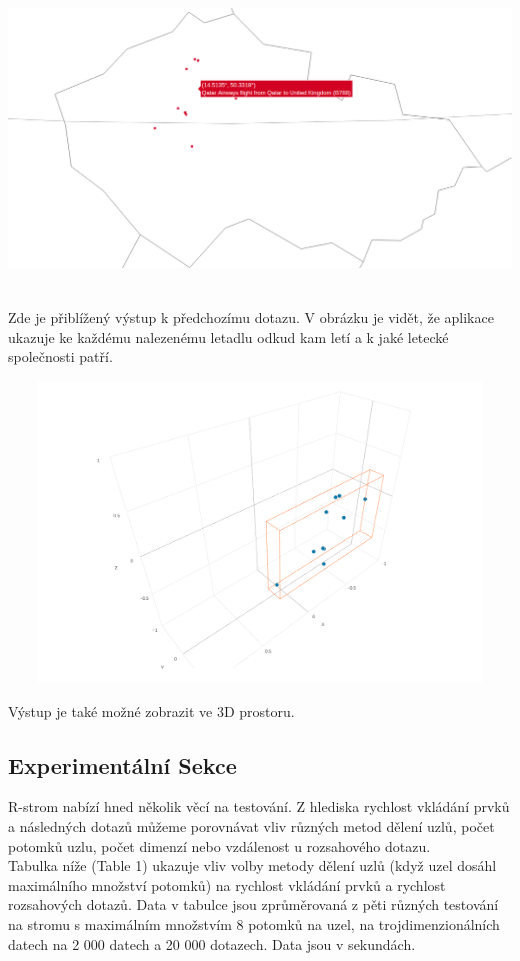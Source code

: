 \documentclass[12pt,a4paper]{article}
\begin{document}
\begin{center}
\includegraphics[width=15cm, height=8cm]{output2}
\end{center}
Zde je přiblížený výstup k předchozímu dotazu. V obrázku je vidět, že aplikace ukazuje ke každému nalezenému letadlu odkud kam letí a k jaké letecké společnosti patří.

\begin{center}
\includegraphics[width=15cm, height=8cm]{output3}
\end{center}
Výstup je také možné zobrazit ve 3D prostoru.


\subsection*{Experimentální Sekce}
R-strom nabízí hned několik věcí na testování. Z hlediska rychlost vkládání prvků a následných dotazů můžeme porovnávat vliv různých metod dělení uzlů, počet potomků uzlu, počet dimenzí nebo vzdálenost u rozsahového dotazu.\\[0.5cm]
Tabulka níže (Table 1) ukazuje vliv volby metody dělení uzlů (když uzel dosáhl maximálního množství potomků) na rychlost vkládání prvků a rychlost rozsahových dotazů. Data v tabulce jsou zprůměrovaná z pěti různých testování na stromu s maximálním množstvím 8 potomků na uzel, na trojdimenzionálních datech na 2 000 datech a 20 000 dotazech. Data jsou v sekundách.
 
\end{document}
